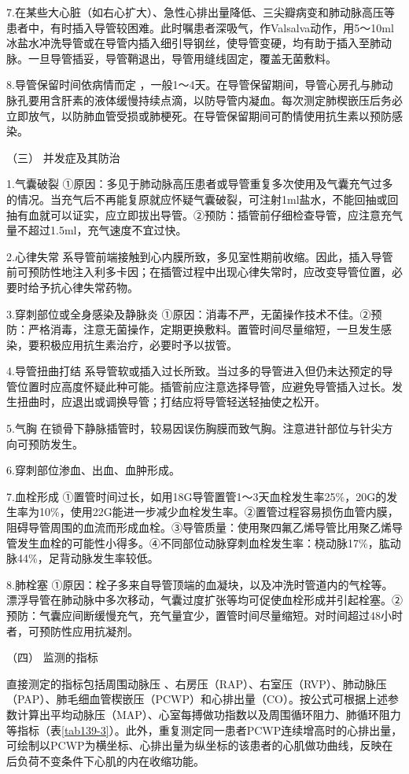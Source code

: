 7.在某些大心脏（如右心扩大）、急性心排出量降低、三尖瓣病变和肺动脉高压等患者中，有时插入导管较困难。此时嘱患者深吸气，作Valsalva动作，用5～10ml冰盐水冲洗导管或在导管内插入细引导钢丝，使导管变硬，均有助于插入至肺动脉。一旦导管插妥，导管鞘退出，导管用缝线固定，覆盖无菌敷料。

8.导管保留时间依病情而定
，一般1～4天。在导管保留期间，导管心房孔与肺动脉孔要用含肝素的液体缓慢持续点滴，以防导管内凝血。每次测定肺楔嵌压后务必立即放气，以防肺血管受损或肺梗死。在导管保留期间可酌情使用抗生素以预防感染。

\hypertarget{text00376.htmlux5cux23CHP16-6-5-3}{}
（三） 并发症及其防治

1.气囊破裂
①原因：多见于肺动脉高压患者或导管重复多次使用及气囊充气过多的情况。当充气后不再能复原就应怀疑气囊破裂，可注射1ml盐水，不能回抽或回抽有血就可以证实，应立即拔出导管。②预防：插管前仔细检查导管，应注意充气量不超过1.5ml，充气速度不宜过快。

2.心律失常
系导管前端接触到心内膜所致，多见室性期前收缩。因此，插入导管前可预防性地注入利多卡因；在插管过程中出现心律失常时，应改变导管位置，必要时给予抗心律失常药物。

3.穿刺部位或全身感染及静脉炎
①原因：消毒不严，无菌操作技术不佳。②预防：严格消毒，注意无菌操作，定期更换敷料。置管时间尽量缩短，一旦发生感染，要积极应用抗生素治疗，必要时予以拔管。

4.导管扭曲打结
系导管软或插入过长所致。当过多的导管进入但仍未达预定的导管位置时应高度怀疑此种可能。插管前应注意选择导管，应避免导管插入过长。发生扭曲时，应退出或调换导管；打结应将导管轻送轻抽使之松开。

5.气胸
在锁骨下静脉插管时，较易因误伤胸膜而致气胸。注意进针部位与针尖方向可预防发生。

6.穿刺部位渗血、出血、血肿形成。

7.血栓形成
①置管时间过长，如用18G导管置管1～3天血栓发生率25\%，20G的发生率为10\%，使用22G能进一步减少血栓发生率。②置管过程容易损伤血管内膜，阻碍导管周围的血流而形成血栓。③导管质量：使用聚四氟乙烯导管比用聚乙烯导管发生血栓的可能性小得多。④不同部位动脉穿刺血栓发生率：桡动脉17\%，肱动脉44\%，足背动脉发生率较低。

8.肺栓塞
①原因：栓子多来自导管顶端的血凝块，以及冲洗时管道内的气栓等。漂浮导管在肺动脉中多次移动，气囊过度扩张等均可促使血栓形成并引起栓塞。②预防：气囊应间断缓慢充气，充气量宜少，置管时间尽量缩短。对时间超过48小时者，可预防性应用抗凝剂。

\hypertarget{text00376.htmlux5cux23CHP16-6-5-4}{}
（四） 监测的指标

直接测定的指标包括周围动脉压
、右房压（RAP）、右室压（RVP）、肺动脉压（PAP）、肺毛细血管楔嵌压（PCWP）和心排出量（CO）。按公式可根据上述参数计算出平均动脉压（MAP）、心室每搏做功指数以及周围循环阻力、肺循环阻力等指标（表\ref{tab139-3}）。此外，重复测定同一患者PCWP连续增高时的心排出量，可绘制以PCWP为横坐标、心排出量为纵坐标的该患者的心肌做功曲线，反映在后负荷不变条件下心肌的内在收缩功能。

